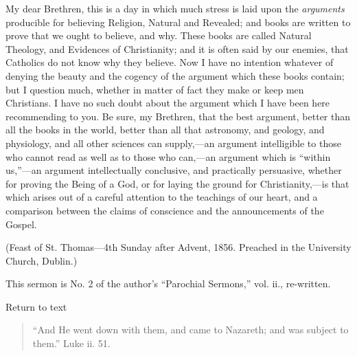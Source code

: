 My dear Brethren, this is a day in which much stress
is laid upon the \emph{arguments} producible for
believing Religion, Natural and Revealed; and books are
written to prove that we ought to believe, and why. These
books are called Natural Theology, and Evidences of
Christianity; and it is often said by our enemies, that
Catholics do not know why they believe. Now I have no
intention whatever of denying the beauty and the cogency
of the argument which these books contain; but I question
much, whether in matter of fact they make or keep men
Christians. I have no such doubt about the argument which
I have been here recommending to you. Be sure, my
Brethren, that the best argument, better than all the
books in the world, better than all that astronomy, and
geology, and physiology, and all other sciences can
supply,—an argument intelligible to those who cannot
read as well as to those who can,—an argument which
is ``within us,''—an argument intellectually
conclusive, and practically persuasive, whether for
proving the Being of a God, or for laying the ground for
Christianity,—is that which arises out of a careful
attention to the teachings of our heart, and a comparison
between the claims of conscience and the announcements of
the Gospel.

(Feast of St. Thomas—4th Sunday after Advent, 1856. Preached in the
University Church, Dublin.)


This sermon is No. 2 of the author's ``Parochial
Sermons,'' vol. ii., re-written.

Return to text


\begin{quote}

``And He went down with them, and came to
Nazareth; and was subject to them.'' Luke ii. 51.

\end{quote}

